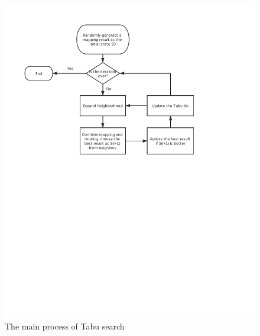 \begin{figure}
    \centering
    \includegraphics{../Figures/main_flowchart.pdf}%
    \caption{The main process of Tabu search}
\end{figure}

